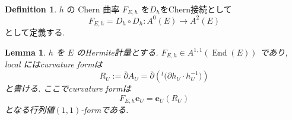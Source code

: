 \documentclass[dvipdfmx,a4paper,11pt]{article} %
\newtheorem{lem}[thm]{Lemma}
\theoremstyle{definition}
\newtheorem{defn}[thm]{Definition}
\theoremstyle{remark}
\newtheorem{rem}[thm]{Remark}
\numberwithin{equation}{section}
\newcommand{\End}[0]{\operatorname{End}}
\begin{document}

\begin{defn}
\(h\) の Chern 曲率 \(F_{E,h}\) を$D_h$をChern接続として
\[
F_{E,h}=D_{h} \circ D_h : A^0(E) \to A^2(E) 
\]
として定義する.
\end{defn}

\begin{lem}
\(h\) を \(E\) のHermite計量とする. 
\(F_{E,h} \in A^{1,1}(\End(E))\) であり, 
local にはcurvature formは
\[
R_U:=
\overline{\partial}A_U
=\overline{\partial}\left( {}^t\bigl(\partial h_U\cdot h_U^{-1}\bigr) \right)
\]
と書ける.
ここでcurvature formは
$$
F_{E, h}\mathbf{e}_U
=\mathbf{e}_U(R_U)
$$
となる行列値$(1,1)$-formである. 
\end{lem}
\end{document}
